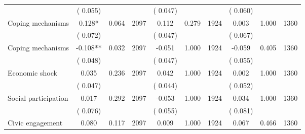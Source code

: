 \begin{tabular}{l*{9}{c}}
                               &        (       0.055) & &                                                                 &       (       0.047) & &                                                          &       (       0.060) & &  \\ 
 Coping mechanisms                 &              0.128*          &        0.064 & 2097          &              0.112 &        0.279 & 1924                   &        0.003 &        1.000 & 1360                 \\ 
                               &        (       0.072) & &                                                                 &       (       0.047) & &                                                          &       (       0.067) & &  \\ 
 Coping mechanisms                 &             -0.108**          &        0.032 & 2097          &             -0.051 &        1.000 & 1924                   &       -0.059 &        0.405 & 1360                 \\ 
                               &        (       0.048) & &                                                                 &       (       0.047) & &                                                          &       (       0.055) & &   \\ 
 Economic shock                 &              0.035          &        0.236 & 2097          &              0.042 &        1.000 & 1924                   &        0.002 &        1.000 & 1360                 \\ 
                               &        (       0.047) & &                                                                 &       (       0.044) & &                                                          &       (       0.052) & &   \\ 
 Social participation                 &              0.017          &        0.292 & 2097          &             -0.053 &        1.000 & 1924                   &        0.034 &        1.000 & 1360                 \\ 
                               &        (       0.076) & &                                                                 &       (       0.055) & &                                                          &       (       0.081) & &  \\ 
 Civic engagement                &              0.080        &        0.117 & 2097        &              0.009 &        1.000 & 1924               &        0.067 &        0.466 & 1360       \\ 

\end{tabular}
